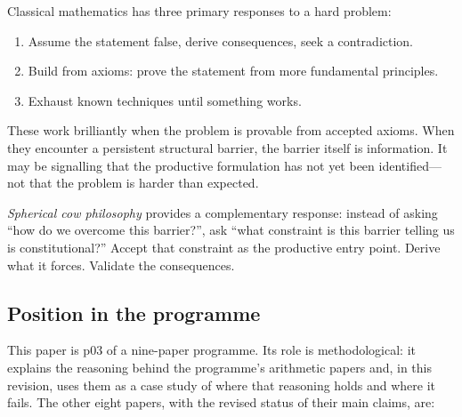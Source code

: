 \documentclass[12pt]{amsart}
\theoremstyle{plain}
\theoremstyle{definition}
\theoremstyle{remark}
\begin{document}
Classical mathematics has three primary responses to a hard problem:
\begin{enumerate}[label=(\arabic*)]
  \item Assume the statement false, derive consequences, seek a contradiction.
  \item Build from axioms: prove the statement from more fundamental principles.
  \item Exhaust known techniques until something works.
\end{enumerate}
These work brilliantly when the problem is provable from accepted axioms.
When they encounter a persistent structural barrier, the barrier itself is
information. It may be signalling that the productive formulation has not yet
been identified---not that the problem is harder than expected.

\emph{Spherical cow philosophy} provides a complementary response: instead of
asking ``how do we overcome this barrier?'', ask ``what constraint is this
barrier telling us is constitutional?'' Accept that constraint as the productive
entry point. Derive what it forces. Validate the consequences.

\subsection{Position in the programme}

This paper is p03 of a nine-paper programme. Its role is methodological: it
explains the reasoning behind the programme's arithmetic papers and, in this
revision, uses them as a case study of where that reasoning holds and where it
fails. The other eight papers, with the revised status of their main claims,
are:
\end{document}
